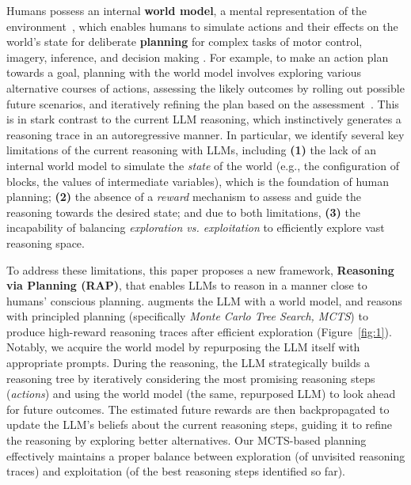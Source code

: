 Humans possess an internal {\bf world model}, a mental representation of the environment~\cite{johnson1983mental, johnson2010mental, gentner2014mental}, which enables humans to simulate actions and their effects on the world's state for deliberate {\bf planning} for complex tasks of motor control, imagery, inference, and decision making \cite{tolman1948cognitive, briscoe2011mental, schulkin2012action, lecun2022path}. For example, to make an action plan towards a goal, planning with the world model involves exploring various alternative courses of actions, assessing the likely outcomes by rolling out possible future scenarios, and iteratively refining the plan based on the assessment~\cite{huys2012bonsai, gasparski2014designology, ho2021control}. This is in stark contrast to the current LLM reasoning, which instinctively generates a reasoning trace in an autoregressive manner. In particular, we identify several key limitations of the current reasoning with LLMs, including {\bf (1)} the lack of an internal world model to simulate the \emph{state} of the world (e.g., the configuration of blocks, the values of intermediate variables),
which is the foundation of human planning; {\bf (2)} the absence of a \emph{reward} mechanism to assess and guide the reasoning towards the desired state; and due to both limitations, {\bf (3)} the incapability of balancing \emph{exploration vs. exploitation} to efficiently explore vast reasoning space.


To address these limitations, this paper proposes a new framework, {\bf Reasoning via Planning (RAP)}, that enables LLMs to reason in a manner close to humans' conscious planning. \ours augments the LLM with a world model, and reasons with principled planning (specifically \emph{Monte Carlo Tree Search, MCTS}) to produce high-reward reasoning traces after efficient exploration (Figure~\ref{fig:1}). Notably, we acquire the world model by repurposing the LLM itself with appropriate prompts. During the reasoning, the LLM strategically builds a reasoning tree by iteratively considering the most promising reasoning steps (\emph{actions}) and using the world model (the same, repurposed LLM) to look ahead for future outcomes. The estimated future rewards are then backpropagated to update the LLM's beliefs about the current reasoning steps, guiding it to refine the reasoning by exploring better alternatives. Our MCTS-based planning effectively maintains a proper balance between exploration (of unvisited reasoning traces) and exploitation (of the best reasoning steps identified so far). 

